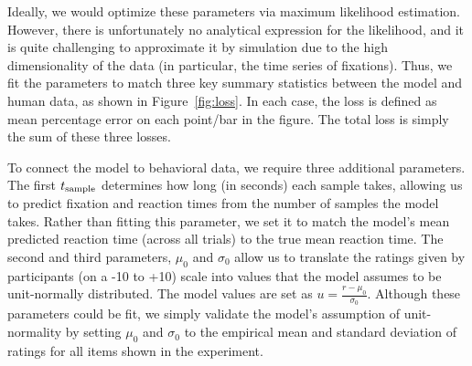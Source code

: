 \documentclass[12pt,a4paperpaper,]{article}
\begin{document}
Ideally, we would optimize these parameters via maximum likelihood estimation. However, there is unfortunately no analytical expression for the likelihood, and it is quite challenging to approximate it by simulation due to the high dimensionality of the data (in particular, the time series of fixations). Thus, we fit the parameters to match three key summary statistics between the model and human data, as shown in Figure~\ref{fig:loss}. In each case, the loss is defined as mean percentage error on each point/bar in the figure. The total loss is simply the sum of these three losses.

To connect the model to behavioral data, we require three additional parameters. The first $t_\text{sample}$ determines how long (in seconds) each sample takes, allowing us to predict fixation and reaction times from the number of samples the model takes. Rather than fitting this parameter, we set it to match the model's mean predicted reaction time (across all trials) to the true mean reaction time. The second and third parameters, $\mu_0$ and $\sigma_0$ allow us to translate the ratings given by participants (on a -10 to +10) scale into values that the model assumes to be unit-normally distributed. The model values are set as $u = \frac{r - \mu_0}{\sigma_0}$. Although these parameters could be fit, we simply validate the model's assumption of unit-normality by setting $\mu_0$ and $\sigma_0$ to the empirical mean and standard deviation of ratings for all items shown in the experiment.

\end{document}
